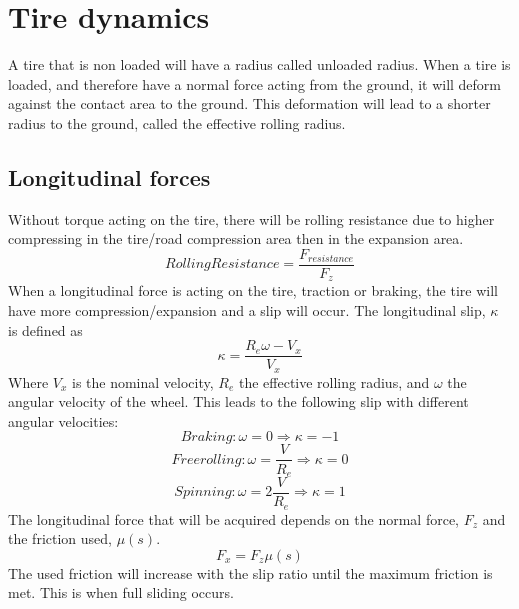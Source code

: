 \section{Tire dynamics}

A tire that is non loaded will have a radius called unloaded radius. When a tire is loaded, and therefore have a normal force acting from the ground, it will deform against the contact area to the ground. This deformation will lead to a shorter radius to the ground, called the effective rolling radius. 

\subsection{Longitudinal forces}
Without torque acting on the tire, there will be rolling resistance due to higher compressing in the tire/road compression area then in the expansion area.
\begin{equation}
RollingResistance = \frac{F_{resistance}}{F_{z}}
\end{equation}
When a longitudinal force is acting on the tire, traction or braking, the tire will have more compression/expansion and a slip will occur. The longitudinal slip, $ \kappa $ is defined as
\begin{equation}
\kappa = \dfrac{R_{e}\omega-V_{x}}{V_{x}}
\end{equation}
Where $V_{x}$ is the nominal velocity, $R_{e}$ the effective rolling radius, and $\omega$ the angular velocity of the wheel. This leads to the following slip with different angular velocities:
\begin{equation}
Braking: \omega = 0 \Rightarrow \kappa = -1
\end{equation}
\begin{equation}
Free rolling: \omega = \frac{V}{R_{e}} \Rightarrow \kappa = 0
\end{equation}
\begin{equation}
Spinning: \omega = 2\frac{V}{R_{e}} \Rightarrow \kappa = 1
\end{equation}
The longitudinal force that will be acquired depends on the normal force, $ F_{z} $ and the friction used, $ \mu(s) $.
\begin{equation}
F_{x} = F_{z}\mu(s)
\end{equation}
The used friction will increase with the slip ratio until the maximum friction is met. This is when full sliding occurs. 


